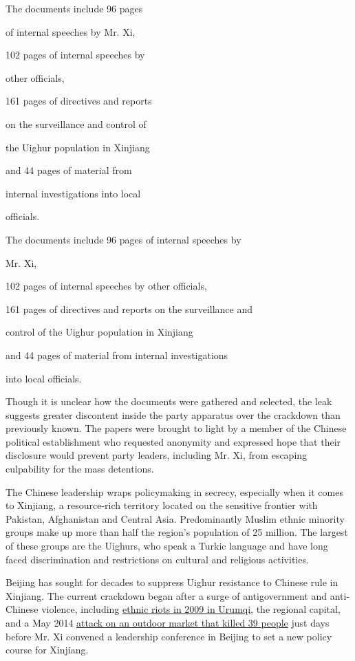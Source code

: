 The documents include 96 pages

of internal speeches by Mr. Xi,

102 pages of internal speeches by

other officials,

161 pages of directives and reports

on the surveillance and control of

the Uighur population in Xinjiang

and 44 pages of material from

internal investigations into local

officials.

The documents include 96 pages of internal speeches by

Mr. Xi,

102 pages of internal speeches by other officials,

161 pages of directives and reports on the surveillance and

control of the Uighur population in Xinjiang

and 44 pages of material from internal investigations

into local officials.

Though it is unclear how the documents were gathered and selected, the
leak suggests greater discontent inside the party apparatus over the
crackdown than previously known. The papers were brought to light by a
member of the Chinese political establishment who requested anonymity
and expressed hope that their disclosure would prevent party leaders,
including Mr. Xi, from escaping culpability for the mass detentions.

The Chinese leadership wraps policymaking in secrecy, especially when it
comes to Xinjiang, a resource-rich territory located on the sensitive
frontier with Pakistan, Afghanistan and Central Asia. Predominantly
Muslim ethnic minority groups make up more than half the region's
population of 25 million. The largest of these groups are the Uighurs,
who speak a Turkic language and have long faced discrimination and
restrictions on cultural and religious activities.

Beijing has sought for decades to suppress Uighur resistance to Chinese
rule in Xinjiang. The current crackdown began after a surge of
antigovernment and anti-Chinese violence, including
\href{https://www.nytimes.com/2009/07/18/world/asia/18xinjiang.html}{ethnic
riots in 2009 in Urumqi}, the regional capital, and a May 2014
\href{https://www.nytimes.com/2014/12/09/world/asia/8-sentenced-to-death-for-terrorist-attacks-in-western-china.html}{attack
on an outdoor market that killed 39 people} just days before Mr. Xi
convened a leadership conference in Beijing to set a new policy course
for Xinjiang.

